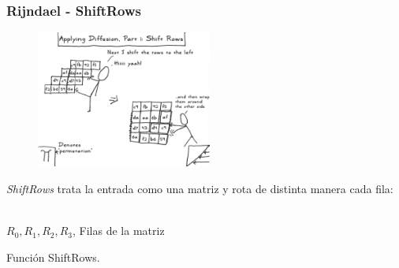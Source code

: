 \documentclass{beamer}
\begin{document}
\begin{frame}

	\end{frame}
	
	\begin{frame}
	\frametitle{Rijndael - ShiftRows}
	\begin{figure}
		\centering
		\includegraphics[height=4.5cm]{./Images/xkcd-shiftrows.png}
	\end{figure}

	\textit{ShiftRows} trata la entrada como una matriz y rota de distinta manera cada fila:
	
	\begin{algorithm}[H]
		\begin{algorithmic}[1]
			\REQUIRE \ \\
			\texttt{$R_0, R_1, R_2, R_3$}, Filas de la matriz\\
			\ENDFOR
		\end{algorithmic}
		\caption{Función ShiftRows.}
	\end{algorithm}	
	\end{frame}
	
\end{document}
